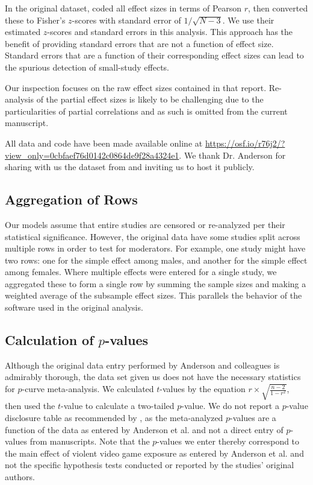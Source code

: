 \documentclass[man, mask]{apa6}
\begin{document}
In the original dataset, \citet{Anderson:etal:2010} coded all effect sizes in terms of Pearson $r$, then converted these to Fisher's $z$-scores with standard error of $1/\sqrt{N-3}$. We use their estimated $z$-scores and standard errors in this analysis. This approach has the benefit of providing standard errors that are not a function of effect size. Standard errors that are a function of their corresponding effect sizes can lead to the spurious detection of small-study effects.

Our inspection focuses on the raw effect sizes contained in that report. Re-analysis of the partial effect sizes is likely to be challenging due to the particularities of partial correlations \citep[see, e.g.,][]{Aloe:2014} and as such is omitted from the current manuscript.

All data and code have been made available online at \url{https://osf.io/r76j2/?view\_only=0cbfaef76d0142c0864de9f28a4324e1}. We thank Dr. Anderson for sharing with us the dataset from \citet{Anderson:etal:2010} and inviting us to host it publicly. 

\subsection{Aggregation of Rows}
Our models assume that entire studies are censored or re-analyzed per their statistical significance. However, the original data have some studies split across multiple rows in order to test for moderators. For example, one study might have two rows: one for the simple effect among males, and another for the simple effect among females. Where multiple effects were entered for a single study, we aggregated these to form a single row by summing the sample sizes and making a weighted average of the subsample effect sizes. This parallels the behavior of the software used in the original analysis. 

\subsection{Calculation of $p$-values}
Although the original data entry performed by Anderson and colleagues is admirably thorough, the data set given us does not have the necessary statistics for $p$-curve meta-analysis. We calculated $t$-values by the equation $r \times \sqrt{\frac{n-2}{1-r^2}}$, then used the $t$-value to calculate a two-tailed $p$-value. We do not report a $p$-value disclosure table as recommended by \citet{Simonsohn:etal:2014}, as the meta-analyzed $p$-values are a function of the data as entered by Anderson et al. and not a direct entry of $p$-values from manuscripts.
Note that the $p$-values we enter thereby correspond to the main effect of violent video game exposure as entered by Anderson et al. and not the specific hypothesis tests conducted or reported by the studies' original authors.
\end{document}
